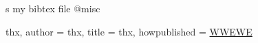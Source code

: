 s   
my bibtex file
@misc{thx,
  author = {thx},
  title = {thx},            
    howpublished = {\url{
    WWEWE
    }
    }

}
